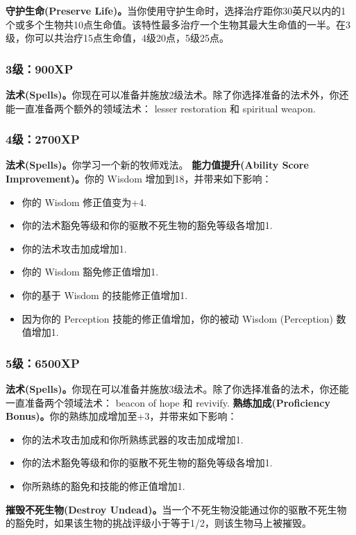 \documentclass[letterpaper,twocolumn,openany,nodeprecatedcode]{dndbook}
\begin{document}
\textbf{守护生命(Preserve Life)。}当你使用守护生命时，选择治疗距你30英尺以内的1个或多个生物共10点生命值。该特性最多治疗一个生物其最大生命值的一半。在3级，你可以共治疗15点生命值，4级20点，5级25点。

\subsubsection{3级：900XP}
\textbf{法术(Spells)。}你现在可以准备并施放2级法术。除了你选择准备的法术外，你还能一直准备两个额外的领域法术： lesser restoration 和 spiritual weapon.

\subsubsection{4级：2700XP}
\textbf{法术(Spells)。}你学习一个新的牧师戏法。
\textbf{能力值提升(Ability Score Improvement)。}你的 Wisdom 增加到18，并带来如下影响：
\begin{itemize}
\item 你的 Wisdom 修正值变为+4.
\item 你的法术豁免等级和你的驱散不死生物的豁免等级各增加1.
\item 你的法术攻击加成增加1.
\item 你的 Wisdom 豁免修正值增加1.
\item 你的基于 Wisdom 的技能修正值增加1.
\item 因为你的 Perception 技能的修正值增加，你的被动 Wisdom (Perception) 数值增加1.
\end{itemize}

\subsubsection{5级：6500XP}
\textbf{法术(Spells)。}你现在可以准备并施放3级法术。除了你选择准备的法术，你还能一直准备两个领域法术： beacon of hope 和 revivify.
\textbf{熟练加成(Proficiency Bonus)。}你的熟练加成增加至+3，并带来如下影响：
\begin{itemize}
\item 你的法术攻击加成和你所熟练武器的攻击加成增加1.
\item 你的法术豁免等级和你的驱散不死生物的豁免等级各增加1.
\item 你所熟练的豁免和技能的修正值增加1.
\end{itemize}

\textbf{摧毁不死生物(Destroy Undead)。}当一个不死生物没能通过你的驱散不死生物的豁免时，如果该生物的挑战评级小于等于1/2，则该生物马上被摧毁。
\end{document}
